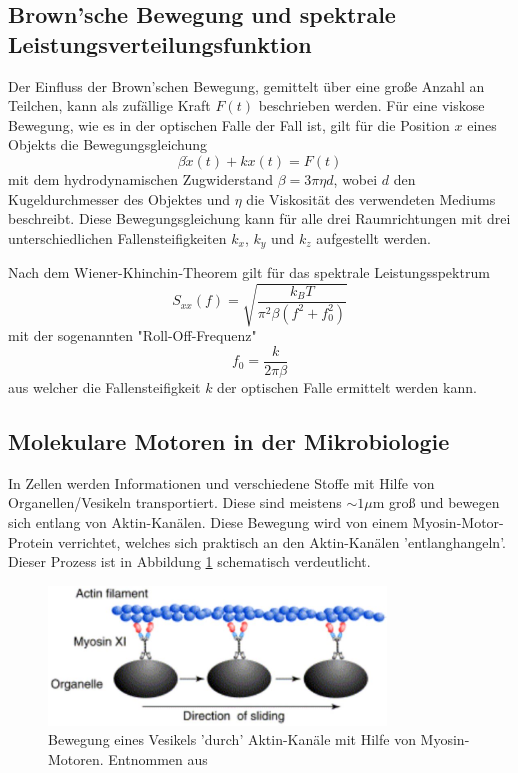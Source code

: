   \subsection{Brown'sche Bewegung und spektrale Leistungsverteilungsfunktion}
    Der Einfluss der Brown'schen Bewegung, gemittelt über eine große Anzahl an Teilchen, kann als zufällige Kraft $F(t)$ beschrieben werden. Für eine viskose Bewegung, wie es in der optischen Falle der Fall ist, gilt für die Position $x$ eines Objekts die Bewegungsgleichung
    \begin{equation}
      \beta \dot{x}(t) + kx(t) = F(t)
    \end{equation}
    mit dem hydrodynamischen Zugwiderstand $\beta = 3\pi\eta d$, wobei $d$ den Kugeldurchmesser des Objektes und $\eta$ die Viskosität des verwendeten Mediums beschreibt. Diese Bewegungsgleichung kann für alle drei Raumrichtungen mit drei unterschiedlichen Fallensteifigkeiten $k_x$, $k_y$ und $k_z$ aufgestellt werden.

    Nach dem Wiener-Khinchin-Theorem gilt für das spektrale Leistungsspektrum
    \begin{equation}
      S_{xx}(f) = \sqrt{\frac{k_B T}{\pi^2\beta(f^2+f_0^2)}}
      \label{eqn:Leistung}
    \end{equation}
    mit der sogenannten "Roll-Off-Frequenz"
    \begin{equation}
      f_0 = \frac{k}{2\pi\beta}
      \label{eqn:Roll}
    \end{equation}
    aus welcher die Fallensteifigkeit $k$ der optischen Falle ermittelt werden kann.
  \subsection{Molekulare Motoren in der Mikrobiologie}
    In Zellen werden Informationen und verschiedene Stoffe mit Hilfe von Organellen/Vesikeln transportiert. Diese sind meistens $\sim 1\mu\text{m}$ groß und bewegen sich entlang von Aktin-Kanälen. Diese Bewegung wird von einem Myosin-Motor-Protein verrichtet, welches sich praktisch an den Aktin-Kanälen 'entlanghangeln'. Dieser Prozess ist in Abbildung \ref{fig:Motor} schematisch verdeutlicht.
    \begin{figure}[h]
      \centering
      \includegraphics[width = 0.8\textwidth]{pictures/Motor.png}
      \caption{Bewegung eines Vesikels 'durch' Aktin-Kanäle mit Hilfe von Myosin-Motoren. Entnommen aus \cite{tu_dortmund_versuchsanleitung_OptischePinzette}}
      \label{fig:Motor}
    \end{figure}
    